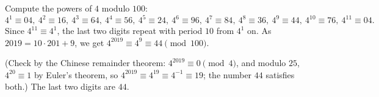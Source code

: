 Compute the powers of $4$ modulo $100$:
\[
4^1\equiv04,\ 4^2\equiv16,\ 4^3\equiv64,\ 4^4\equiv56,\ 4^5\equiv24,\ 4^6\equiv96,\ 4^7\equiv84,\ 4^8\equiv36,\ 4^9\equiv44,\ 4^{10}\equiv76,\ 4^{11}\equiv04 .
\]
Since $4^{11}\equiv4^1$, the last two digits repeat with period $10$ from $4^1$ on. As $2019=10\cdot201+9$, we get $4^{2019}\equiv4^9\equiv44\pmod{100}$.

(Check by the Chinese remainder theorem: $4^{2019}\equiv0\pmod4$, and modulo $25$, $4^{20}\equiv1$ by Euler's theorem, so $4^{2019}\equiv4^{19}\equiv4^{-1}\equiv19$; the number $44$ satisfies both.) The last two digits are $\boxed{44}$.
